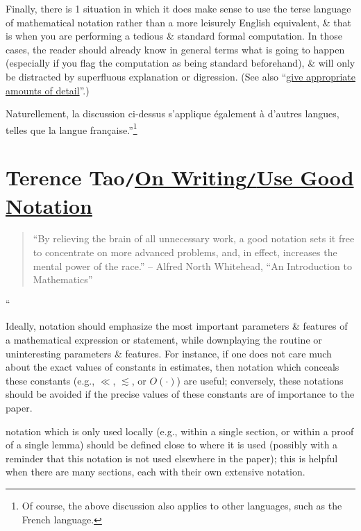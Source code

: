 \documentclass[oneside]{book}
\numberwithin{equation}{section}
\begin{document}
Finally, there is 1 situation in which it does make sense to use the terse language of mathematical notation rather than a more leisurely English equivalent, \& that is when you are performing a tedious \& standard formal computation. In those cases, the reader should already know in general terms what is going to happen (especially if you flag the computation as being standard beforehand), \& will only be distracted by superfluous explanation or digression. (See also ``\href{https://terrytao.wordpress.com/advice-on-writing-papers/give-appropriate-amounts-of-detail/}{give appropriate amounts of detail}''.)

Naturellement, la discussion ci-dessus s'applique également à d'autres langues, telles que la langue française.''\footnote{Of course, the above discussion also applies to other languages, such as the French language.}

\section{Terence Tao\texttt{/}\href{https://terrytao.wordpress.com/advice-on-writing-papers/use-good-notation/}{On Writing\texttt{/}Use Good Notation}}
\begin{quotation}
	``By relieving the brain of all unnecessary work, a good notation sets it free to concentrate on more advanced problems, and, in effect, increases the mental power of the race.'' -- Alfred North Whitehead, ``An Introduction to Mathematics''
\end{quotation}
``

Ideally, notation should emphasize the most important parameters \& features of a mathematical expression or statement, while downplaying the routine or uninteresting parameters \& features. For instance, if one does not care much about the exact values of constants in estimates, then notation which conceals these constants (e.g., $\ll$, $\lesssim$, or $O(\cdot)$) are useful; conversely, these notations should be avoided if the precise values of these constants are of importance to the paper.

 notation which is only used locally (e.g., within a single section, or within a proof of a single lemma) should be defined close to where it is used (possibly with a reminder that this notation is not used elsewhere in the paper); this is helpful when there are many sections, each with their own extensive notation.
\end{document}
